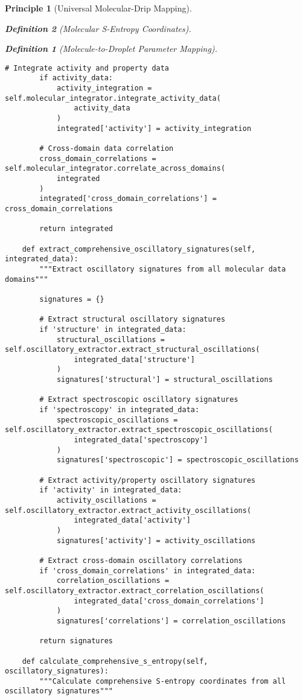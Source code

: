 \documentclass[12pt,a4paper]{article}
\newtheorem{definition}{Definition}
\newtheorem{principle}{Principle}
\begin{document}
\begin{principle}[Universal Molecular-Drip Mapping]
\begin{definition}[Molecular S-Entropy Coordinates]
\begin{definition}[Molecule-to-Droplet Parameter Mapping]
\begin{algorithm}
\begin{algorithmic}[1]
\begin{lstlisting}[style=pythonstyle, caption=Core Molecule-to-Drip Implementation for Comprehensive Chemical Analysis]
        # Integrate activity and property data
        if activity_data:
            activity_integration = self.molecular_integrator.integrate_activity_data(
                activity_data
            )
            integrated['activity'] = activity_integration
        
        # Cross-domain data correlation
        cross_domain_correlations = self.molecular_integrator.correlate_across_domains(
            integrated
        )
        integrated['cross_domain_correlations'] = cross_domain_correlations
        
        return integrated
    
    def extract_comprehensive_oscillatory_signatures(self, integrated_data):
        """Extract oscillatory signatures from all molecular data domains"""
        
        signatures = {}
        
        # Extract structural oscillatory signatures
        if 'structure' in integrated_data:
            structural_oscillations = self.oscillatory_extractor.extract_structural_oscillations(
                integrated_data['structure']
            )
            signatures['structural'] = structural_oscillations
        
        # Extract spectroscopic oscillatory signatures
        if 'spectroscopy' in integrated_data:
            spectroscopic_oscillations = self.oscillatory_extractor.extract_spectroscopic_oscillations(
                integrated_data['spectroscopy']
            )
            signatures['spectroscopic'] = spectroscopic_oscillations
        
        # Extract activity/property oscillatory signatures
        if 'activity' in integrated_data:
            activity_oscillations = self.oscillatory_extractor.extract_activity_oscillations(
                integrated_data['activity']
            )
            signatures['activity'] = activity_oscillations
        
        # Extract cross-domain oscillatory correlations
        if 'cross_domain_correlations' in integrated_data:
            correlation_oscillations = self.oscillatory_extractor.extract_correlation_oscillations(
                integrated_data['cross_domain_correlations']
            )
            signatures['correlations'] = correlation_oscillations
        
        return signatures
    
    def calculate_comprehensive_s_entropy(self, oscillatory_signatures):
        """Calculate comprehensive S-entropy coordinates from all oscillatory signatures"""
        

\end{lstlisting}
\end{algorithmic}
\end{algorithm}
\end{definition}
\end{definition}
\end{principle}
\end{document}
